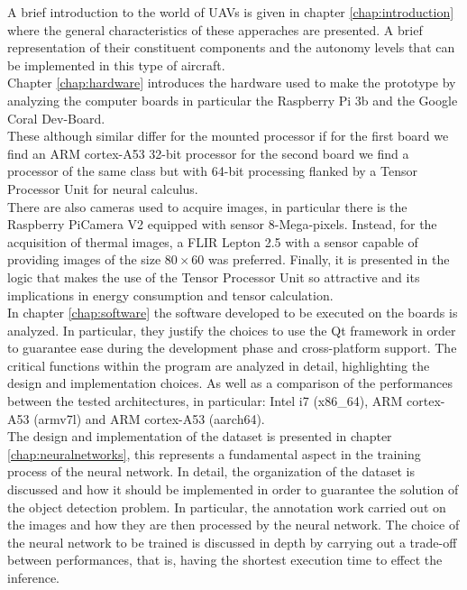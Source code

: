 \noindent A brief introduction to the world of UAVs is given in chapter
\ref{chap:introduction} where the general characteristics of these apperaches
are presented. 
A brief representation of their constituent components and the autonomy levels
that can be implemented in this type of aircraft.\\
\noindent Chapter \ref{chap:hardware} introduces the hardware used to make the
prototype by analyzing the computer boards in particular the Raspberry Pi 3b and
the Google Coral Dev-Board.\\
These although similar differ for the mounted processor if for the first board
we find an ARM cortex-A53 32-bit processor for the second board we find a
processor of the same class but with 64-bit processing flanked by a Tensor
Processor Unit for neural calculus.\\
There are also cameras used to acquire images, in particular there is the
Raspberry PiCamera V2 equipped with sensor 8-Mega-pixels. 
Instead, for the acquisition of thermal images, a FLIR Lepton 2.5 with a sensor
capable of providing images of the size $ 80 \times 60 $ was preferred.
Finally, it is presented in the logic that makes the use of the Tensor Processor
Unit so attractive and its implications in energy consumption and tensor
calculation.\\
\noindent In chapter \ref{chap:software} the software developed to be executed
on the boards is analyzed. 
In particular, they justify the choices to use the Qt framework in
order to guarantee ease during the development phase and cross-platform support.
The critical functions within the program are analyzed in detail, highlighting
the design and implementation choices.
As well as a comparison of the performances between the tested architectures, in
particular: Intel i7 (x86\_64), ARM cortex-A53 (armv7l) and ARM cortex-A53
(aarch64).\\
\noindent The design and implementation of the dataset is presented in chapter
\ref{chap:neuralnetworks}, this represents a fundamental aspect in the training
process of the neural network.
In detail, the organization of the dataset is discussed and how it should be
implemented in order to guarantee the solution of the object detection problem.
In particular, the annotation work carried out on the images and how they are
then processed by the neural network.
The choice of the neural network to be trained is discussed in depth by carrying
out a trade-off between performances, that is, having the shortest execution
time to effect the inference. 
